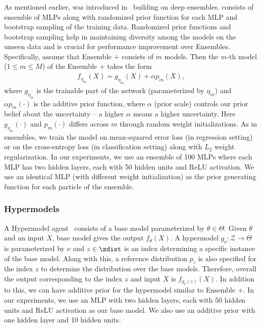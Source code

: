  \subsubsection{\ensembleplus}
 
As mentioned earlier, \ensembleplus was introduced in~\citep{OsbandAsCa18} building on deep ensembles. 
 \ensembleplus consists of ensemble of MLPs along with randomized prior function for each MLP and bootstrap sampling of the training data. Randomized prior functions and bootstrap sampling help in maintaining diversity among the models on the unseen data and is crucial for performance improvement over Ensembles. 
 Specifically, assume that Ensemble $+$ consists of $m$ models. 
 Then the $m$-th model ($1\leq m \le M$) of the Ensemble $+$ takes the form
\begin{align*}
    f_{\eta_m}(X) = g_{\eta_m}(X) + \alpha p_m(X),
\end{align*}
where $g_{\eta_m}$  is the trainable part of the network (parameterized by $\eta_m$) and $\alpha p_m(\cdot)$ is the additive prior function, where $\alpha$ (prior scale) controls our prior belief about the uncertainty -- a higher   $\alpha$ means a higher  uncertainty. 
Here $g_{\eta_m}(\cdot)$ and $p_m(\cdot)$ differs across $m$ through random weight initializations.  
 As in ensembles, we train the model on mean-squared error loss (in regression setting) or on the cross-entropy loss (in classification setting) along with $L_2$ weight regularization. In our experiments, we use an ensemble of 100 MLPs where each MLP has two hidden layers, each with 50 hidden units and ReLU activation. We use an identical MLP (with different weight initialization) as the prior generating function for each particle of the ensemble.


\subsubsection{Hypermodels}

A Hypermodel agent~\citep{DwaracherlaLuIbOsWeVa20} consists of a base model parameterized by $\theta \in \Theta$. Given 
$\theta$ and an input $X$, base model gives the output $ f_\theta(X)$. A hypermodel $g_\nu: {\mathcal Z} \to \Theta$ is parameterized by $\nu$ and $z \in \zdist$ is an index determining a specific instance of the base model. 
Along with this, a reference distribution $p_z$ is also specified for the index $z$ to determine the distribution over the base models. 
Therefore, overall the output corresponding to the index $z$ and input $X$ is $f_{g_\nu (z)}(X)$. 
In addition to this, we can have additive prior for the hypermodel similar to   Ensemble $+$. In our experiments, we use an MLP with two hidden layers, each with 50 hidden units and ReLU activation as our base model. We also use an additive prior with one hidden layer and 10 hidden units. 


